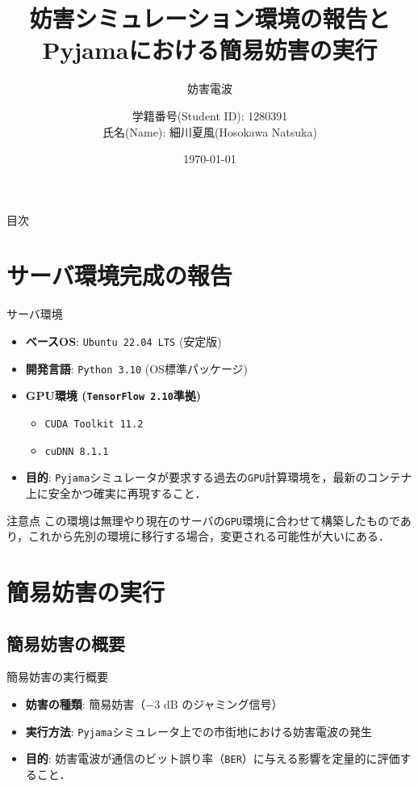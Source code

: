 \documentclass[11pt, aspectratio=169]{beamer}
\title{妨害シミュレーション環境の報告とPyjamaにおける簡易妨害の実行}
\subtitle{妨害電波}
\author{学籍番号(Student ID): 1280391 \\ 氏名(Name): 細川夏風(Hosokawa Natsuka)}
\institute{高知工科大学(Kochi Univ of Tech)}
\date{\today}
\begin{document}
\begin{frame}
  \titlepage
\end{frame}

\begin{frame}{目次}
  \tableofcontents
\end{frame}


\section{サーバ環境完成の報告}

\begin{frame}{サーバ環境}
  \begin{itemize}
    \item \textbf{ベースOS}: \texttt{Ubuntu 22.04 LTS} (安定版)
    \item \textbf{開発言語}: \texttt{Python 3.10} (OS標準パッケージ)
    \item \textbf{GPU環境 (\texttt{TensorFlow 2.10}準拠)}
    \begin{itemize}
      \item \texttt{CUDA Toolkit 11.2}
      \item \texttt{cuDNN 8.1.1}
    \end{itemize}
    \item \textbf{目的}: \texttt{Pyjama}シミュレータが要求する過去の\texttt{GPU}計算環境を，最新のコンテナ上に安全かつ確実に再現すること．
  \end{itemize}
  \begin{alertblock}{注意点}
    この環境は無理やり現在のサーバの\texttt{GPU}環境に合わせて構築したものであり，これから先別の環境に移行する場合，変更される可能性が大いにある．
    \end{alertblock}
\end{frame}

\section{簡易妨害の実行}

\subsection{簡易妨害の概要}

\begin{frame}{簡易妨害の実行概要}
  \begin{itemize}
    \item \textbf{妨害の種類}: 簡易妨害（$-3\text{ dB}$ のジャミング信号）
    \item \textbf{実行方法}: \texttt{Pyjama}シミュレータ上での市街地における妨害電波の発生
    \item \textbf{目的}: 妨害電波が通信のビット誤り率（\texttt{BER}）に与える影響を定量的に評価すること．
  \end{itemize}
\end{frame}
\end{document}
